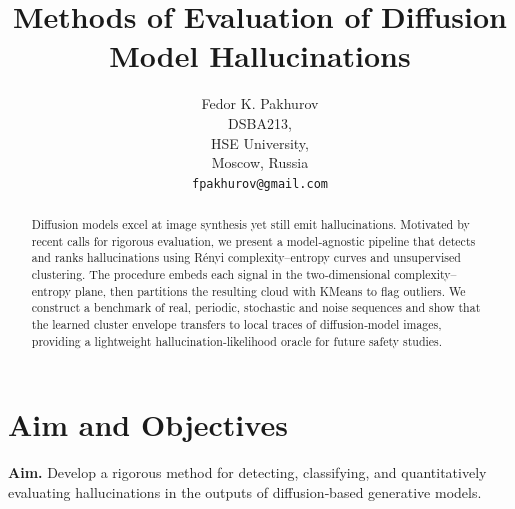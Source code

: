 \documentclass{article}
\title{Methods of Evaluation of Diffusion Model Hallucinations}
\author{
    Fedor K. Pakhurov\\
    DSBA213,\\
    HSE University,\\
    Moscow, Russia\\
    \texttt{fpakhurov@gmail.com}
}
\date{}
\begin{document}
\maketitle

\begin{abstract}
Diffusion models excel at image synthesis yet still emit hallucinations. Motivated by recent calls for rigorous evaluation, we present a model‑agnostic pipeline that detects and ranks hallucinations using Rényi complexity–entropy curves and unsupervised clustering. The procedure embeds each signal in the two‑dimensional complexity–entropy plane, then partitions the resulting cloud with KMeans to flag outliers. We construct a benchmark of real, periodic, stochastic and noise sequences and show that the learned cluster envelope transfers to local traces of diffusion‑model images, providing a lightweight hallucination‑likelihood oracle for future safety studies.
\end{abstract}

\vspace{1.5\baselineskip} 




\clearpage
\tableofcontents


\clearpage
\section{Aim and Objectives}\label{sec:aim}

\textbf{Aim.}\;
Develop a rigorous method for detecting, classifying, and
quantitatively evaluating hallucinations in the outputs of
diffusion‑based generative models.
\end{document}

